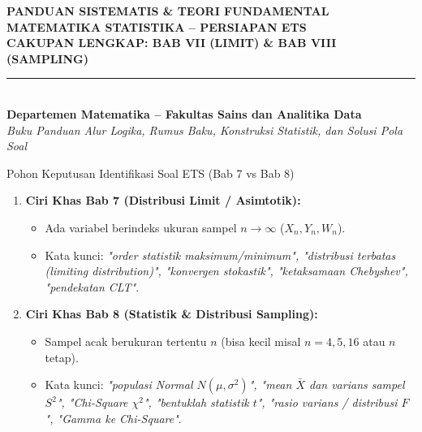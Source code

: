 \documentclass[10pt,twoside]{article}
\begin{document}
\begin{center}
  {\LARGE\bfseries PANDUAN SISTEMATIS \& TEORI FUNDAMENTAL}\\[4pt]
  {\Large\bfseries MATEMATIKA STATISTIKA -- PERSIAPAN ETS}\\[4pt]
  {\normalsize\bfseries CAKUPAN LENGKAP: BAB VII (LIMIT) \& BAB VIII (SAMPLING)}\\[4pt]
  \rule{0.95\textwidth}{1pt}\\[4pt]
  {\small\bfseries Departemen Matematika -- Fakultas Sains dan Analitika Data}\\[2pt]
  {\footnotesize\itshape Buku Panduan Alur Logika, Rumus Baku, Konstruksi Statistik, dan Solusi Pola Soal}
\end{center}
\vspace{0.15cm}

\begin{tipbox}{Pohon Keputusan Identifikasi Soal ETS (Bab 7 vs Bab 8)}
\begin{enumerate}
  \item \textbf{Ciri Khas Bab 7 (Distribusi Limit / Asimtotik):}
  \begin{itemize}
    \item Ada variabel berindeks ukuran sampel $n \to \infty$ ($X_n, Y_n, W_n$).
    \item Kata kunci: \textit{"order statistik maksimum/minimum", "distribusi terbatas (limiting distribution)", "konvergen stokastik", "ketaksamaan Chebyshev", "pendekatan CLT"}.
  \end{itemize}
  \item \textbf{Ciri Khas Bab 8 (Statistik \& Distribusi Sampling):}
  \begin{itemize}
    \item Sampel acak berukuran tertentu $n$ (bisa kecil misal $n=4, 5, 16$ atau $n$ tetap).
    \item Kata kunci: \textit{"populasi Normal $N(\mu,\sigma^2)$", "mean $\bar{X}$ dan varians sampel $S^2$", "Chi-Square $\chi^2$", "bentuklah statistik $t$", "rasio varians / distribusi $F$", "Gamma ke Chi-Square"}.
  \end{itemize}
\end{enumerate}
\end{tipbox}

\end{document}
